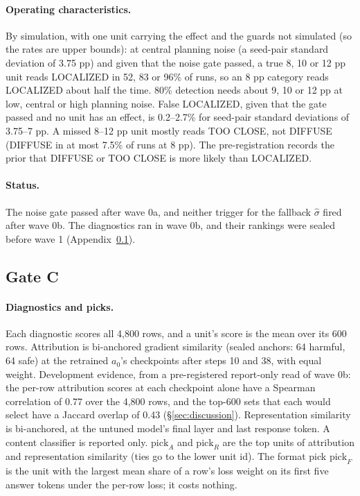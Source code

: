 \documentclass{article}
\theoremstyle{plain}
\theoremstyle{definition}
\theoremstyle{remark}
\begin{document}
\paragraph{Operating characteristics.}
By simulation, with one unit carrying the effect and the guards not simulated
(so the rates are upper bounds): at central planning noise (a seed-pair
standard deviation of 3.75 pp) and given that the noise gate passed, a true 8,
10 or 12 pp unit reads LOCALIZED in 52, 83 or 96\% of runs, so an 8 pp
category reads LOCALIZED about half the time. 80\% detection needs about 9,
10 or 12 pp at low, central or high planning noise. False LOCALIZED, given
that the gate passed and no unit has an effect, is 0.2--2.7\% for seed-pair
standard deviations of 3.75--7 pp. A missed 8--12 pp unit mostly reads TOO
CLOSE, not DIFFUSE (DIFFUSE in at most 7.5\% of runs at 8 pp). The
pre-registration records the prior that DIFFUSE or TOO CLOSE is more likely
than LOCALIZED.

\paragraph{Status.}
The noise gate passed after wave 0a, and neither trigger for the fallback
$\hat\sigma$ fired after wave 0b. The diagnostics ran in wave 0b, and their
rankings were sealed before wave 1 (Appendix~\ref{app:gatec}).

\subsection{Gate C}
\label{app:gatec}

\paragraph{Diagnostics and picks.}
Each diagnostic scores all 4,800 rows, and a unit's score is the mean over its
600 rows. Attribution is bi-anchored gradient similarity (sealed anchors: 64
harmful, 64 safe) at the retrained $a_0$'s checkpoints after steps 10 and 38,
with equal weight. Development evidence, from a pre-registered report-only read of wave 0b: the per-row attribution scores at each checkpoint alone have a Spearman correlation of 0.77 over the 4,800 rows, and the top-600 sets that each would select have a Jaccard overlap of 0.43 (\S\ref{sec:discussion}).
Representation similarity is bi-anchored, at the untuned model's final layer
and last response token. A content classifier is reported
only. $\mathrm{pick}_A$ and $\mathrm{pick}_R$ are the top units of attribution
and representation similarity (ties go to the lower unit id). The format pick
$\mathrm{pick}_F$ is the unit with the largest mean share of a row's loss
weight on its first five answer tokens under the per-row loss; it costs
nothing.
\end{document}

